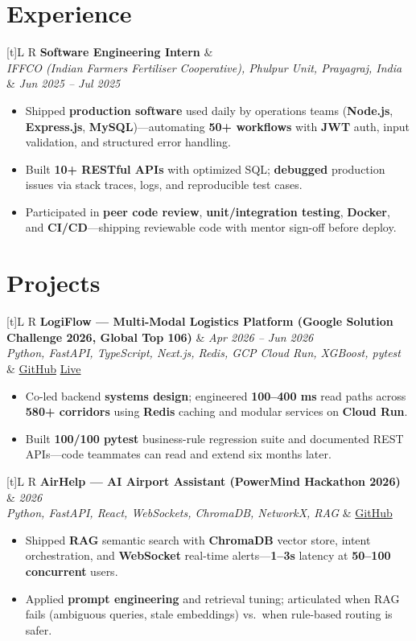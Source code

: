 \documentclass[a4paper,10pt]{article}
\newcommand{\resumeSubheading}[4]{%
  \vspace{0.5mm}
  \noindent
  \begin{tabularx}{\textwidth}[t]{L R}
    \textbf{#1} & #4 \\
    \textit{#3} & \textit{#2} \\
  \end{tabularx}
  \vspace{-0.5mm}%
}
\newcommand{\resumeProject}[4]{%
  \vspace{0.5mm}
  \noindent
  \begin{tabularx}{\textwidth}[t]{L R}
    \textbf{#1} & \textit{#3} \\
    \textit{#2} & #4 \\
  \end{tabularx}
  \vspace{-0.5mm}%
}
\begin{document}
\section{Experience}
\small
\resumeSubheading
  {Software Engineering Intern}{Jun 2025 -- Jul 2025}
  {IFFCO (Indian Farmers Fertiliser Cooperative), Phulpur Unit, Prayagraj, India}{}
\begin{itemize}
  \item Shipped \textbf{production software} used daily by operations teams (\textbf{Node.js}, \textbf{Express.js}, \textbf{MySQL})---automating \textbf{50+ workflows} with \textbf{JWT} auth, input validation, and structured error handling.
  \item Built \textbf{10+ RESTful APIs} with optimized SQL; \textbf{debugged} production issues via stack traces, logs, and reproducible test cases.
  \item Participated in \textbf{peer code review}, \textbf{unit/integration testing}, \textbf{Docker}, and \textbf{CI/CD}---shipping reviewable code with mentor sign-off before deploy.
\end{itemize}

\section{Projects}
\small

\resumeProject
  {LogiFlow --- Multi-Modal Logistics Platform (Google Solution Challenge 2026, Global Top 106)}
  {Python, FastAPI, TypeScript, Next.js, Redis, GCP Cloud Run, XGBoost, pytest}
  {Apr 2026 -- Jun 2026}
  {\href{https://github.com/Ojas-Srivastava05/LogiFlow-Solution-Challenge-2026}{GitHub} \textbar{} \href{https://logi-flow-solution-challenge-2026.vercel.app/}{Live}}
\begin{itemize}
  \item Co-led backend \textbf{systems design}; engineered \textbf{100--400 ms} read paths across \textbf{580+ corridors} using \textbf{Redis} caching and modular services on \textbf{Cloud Run}.
  \item Built \textbf{100/100 pytest} business-rule regression suite and documented REST APIs---code teammates can read and extend six months later.
\end{itemize}

\resumeProject
  {AirHelp --- AI Airport Assistant (PowerMind Hackathon 2026)}
  {Python, FastAPI, React, WebSockets, ChromaDB, NetworkX, RAG}
  {2026}
  {\href{https://github.com/Ojas-Srivastava05/AirHelp-AI-Airport-Assistant}{GitHub}}
\begin{itemize}
  \item Shipped \textbf{RAG} semantic search with \textbf{ChromaDB} vector store, intent orchestration, and \textbf{WebSocket} real-time alerts---\textbf{1--3s} latency at \textbf{50--100 concurrent} users.
  \item Applied \textbf{prompt engineering} and retrieval tuning; articulated when RAG fails (ambiguous queries, stale embeddings) vs.\ when rule-based routing is safer.
\end{itemize}
\end{document}
